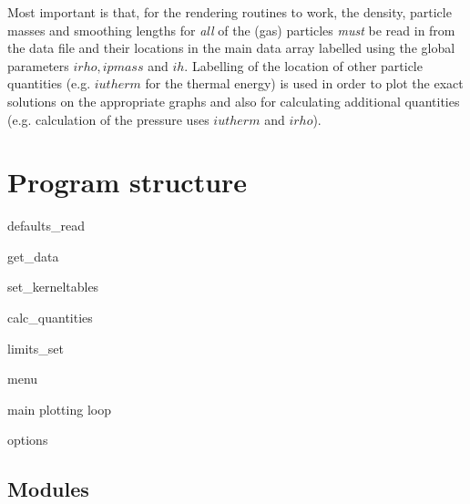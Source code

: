 \documentclass[a4paper,12pt]{article}
\begin{document}
Most important is that, for the rendering routines to work, the density, particle
masses and smoothing lengths for \emph{all} of the (gas) particles \emph{must} be read in from
the data file and their locations in the main data array labelled using the global
parameters $irho, ipmass$ and $ih$. Labelling of the location of other particle
quantities (e.g. $iutherm$ for the thermal energy) is used in
order to plot the exact solutions on the appropriate graphs and also for calculating
additional quantities (e.g. calculation of the pressure uses $iutherm$ and $irho$).

\section{Program structure}

defaults\_read

get\_data

set\_kerneltables

calc\_quantities

limits\_set

menu

main plotting loop

options

\subsection{Modules}
\end{document}
